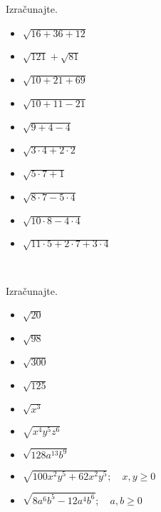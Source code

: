 \begin{multicols}{2}
        
            \begin{naloga}
                Izračunajte.
                \begin{itemize}
                        \item $\sqrt{16+36+12}$ 
                        \item $\sqrt{121}+\sqrt{81}$ 
                        \item $\sqrt{10+21+69}$ 
                        \item $\sqrt{10+11-21}$ 
                        \item $\sqrt{9+4-4}$ 
                        \item $\sqrt{3\cdot 4+2\cdot 2}$ 
                        \item $\sqrt{5\cdot 7 +1}$ 
                        \item $\sqrt{8\cdot 7-5\cdot 4}$ 
                        \item $\sqrt{10\cdot 8-4\cdot 4}$ 
                        \item $\sqrt{11\cdot 5+2\cdot 7+3\cdot 4}$ 
                \end{itemize}
            \end{naloga}
        
            ~~~~\\
        
            \begin{naloga}
                Izračunajte.
                \begin{itemize}
                        \item $\sqrt{20}$ 
                        \item $\sqrt{98}$ 
                        \item $\sqrt{300}$ 
                        \item $\sqrt{125}$ 
                        \item $\sqrt{x^3}$ 
                        \item $\sqrt{x^4y^5z^6}$ 
                        \item $\sqrt{128a^{13}b^9}$ 
                        \item $\sqrt{100x^2y^5+62x^2y^5}; \quad x,y\geq 0$ 
                        \item $\sqrt{8a^6b^5-12a^4b^6}; \quad a,b\geq 0$ 
                \end{itemize}
            \end{naloga}
        



\end{multicols}
